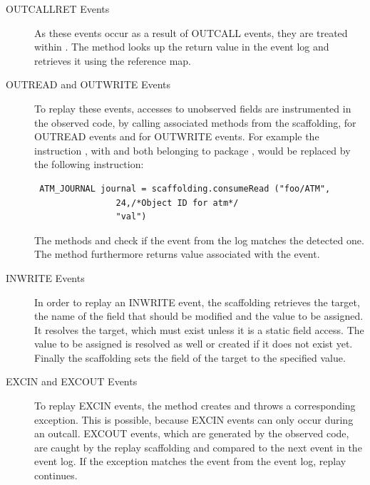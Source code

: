 \begin{description}
 \item [OUTCALLRET Events]As these events occur as a result of OUTCALL events, they are treated within . The method looks up the return value in the event log and retrieves it using the reference map. 
 \item [OUTREAD and OUTWRITE Events] To replay these events, accesses to unobserved fields are instrumented in the observed code, by calling associated methods from the scaffolding,  for OUTREAD events and  for OUTWRITE events. For example the instruction , with  and  both belonging to package , would be replaced by the following instruction:
\begin{lstlisting}
 ATM_JOURNAL journal = scaffolding.consumeRead ("foo/ATM",
                24,/*Object ID for atm*/
                "val")
\end{lstlisting}
The methods  and  check if the event from the log matches the detected one. The method  furthermore returns value associated with the event.
 \item [INWRITE Events] In order to replay an INWRITE event, the scaffolding retrieves the target, the name of the field that should be modified and the value to be assigned. It resolves the target, which must exist unless it is a static field access. The value to be assigned is resolved as well or created if it does not exist yet. Finally the scaffolding sets the field of the target to the specified value.
 \item [EXCIN and EXCOUT Events]  To replay EXCIN events, the method  creates and throws a corresponding exception. This is possible, because EXCIN events can only occur during an outcall. EXCOUT events, which are generated by the observed code, are caught by the replay scaffolding and compared to the next event in the event log. If the exception matches the event from the event log, replay continues.
\end{description}

